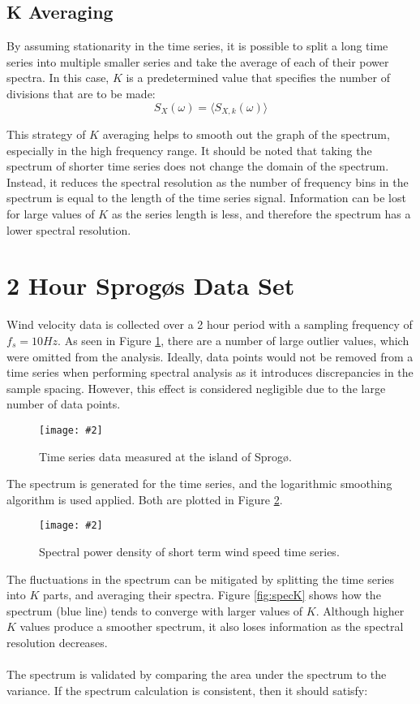 \documentclass[11pt]{article}
\newcommand{\myFigure}[4][0.8]{
\begin{figure}[H] 

	\centering
	\setlength\fboxsep{1pt}
	\setlength\fboxrule{0.5pt}
	\texttt{[image: \#2]}
	\caption{\small #3}
	\label{#4}
\end{figure}
}
\begin{document}
\subsection{K Averaging}
By assuming stationarity in the time series, it is possible to split a long time series into multiple smaller series and take the average of each of their power spectra. In this case, $K$ is a predetermined value that specifies the number of divisions that are to be made:
$$S_X(\omega) = \langle S_{X,k}(\omega)\rangle$$


This strategy of $K$ averaging helps to smooth out the graph of the spectrum, especially in the high frequency range. It should be noted that taking the spectrum of shorter time series does not change the domain of the spectrum. Instead, it reduces the spectral resolution as the number of frequency bins in the spectrum is equal to the length of the time series signal. Information can be lost for large values of $K$ as the series length is less, and therefore the spectrum has a lower spectral resolution.

\section{2 Hour Sprog\o s Data Set}
Wind velocity data is collected over a 2 hour period with a sampling frequency of $f_s = 10 Hz$. As seen in Figure \ref{fig:time}, there are a number of large outlier values, which were omitted from the analysis. Ideally, data points would not be removed from a time series when performing spectral analysis as it introduces discrepancies in the sample spacing. However, this effect is considered negligible due to the large number of data points.

\myFigure{Figures/figTime}{Time series data measured at the island of Sprog\o.}{fig:time}

The spectrum is generated for the time series, and the logarithmic smoothing algorithm is used applied. Both are plotted in Figure \ref{fig:spec1}. 
\myFigure{Figures/figSpec1}{Spectral power density of short term wind speed time series.}{fig:spec1}


The fluctuations in the spectrum can be mitigated by splitting the time series into $K$ parts, and averaging their spectra. Figure \ref{fig:specK} shows how the spectrum (blue line) tends to converge with larger values of $K$. Although higher $K$ values produce a smoother spectrum, it also loses information as the spectral resolution decreases.
\\~\\
The spectrum is validated by comparing the area under the spectrum to the variance. If the spectrum calculation is consistent, then it should satisfy:
\end{document}
